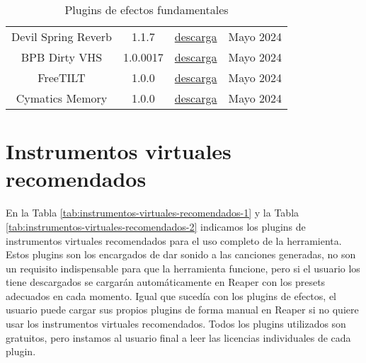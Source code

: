 \begin{table}[h]
\begin{tabular}{c|c|c|c}
            Devil Spring Reverb & 1.1.7 & \href{https://plugins4free.com/plugin/3216/}{descarga} & Mayo 2024\\
            
            BPB Dirty VHS & 1.0.0017 & \href{https://bedroomproducersblog.com/free-vst-plugins/bpb-dirty-vhs/}{descarga} & Mayo 2024\\
            
            FreeTILT & 1.0.0 & \href{https://plugins4free.com/plugin/3743/}{descarga} & Mayo 2024\\
            
            Cymatics Memory & 1.0.0 & \href{https://cymatics.fm/collections/plugins/products/memory-plugin}{descarga} & Mayo 2024\\
            
		\hline
	\end{tabular}
	\caption{Plugins de efectos fundamentales}
	\label{tab:plugins-efectos-fundamentales}
\end{table}


\section{Instrumentos virtuales recomendados}

En la Tabla \ref{tab:instrumentos-virtuales-recomendados-1} y la Tabla \ref{tab:instrumentos-virtuales-recomendados-2} indicamos los plugins de instrumentos virtuales recomendados para el uso completo de la herramienta. Estos plugins son los encargados de dar sonido a las canciones generadas, no son un requisito indispensable para que la herramienta funcione, pero si el usuario los tiene descargados se cargarán automáticamente en Reaper con los presets adecuados en cada momento. Igual que sucedía con los plugins de efectos, el usuario puede cargar sus propios plugins de forma manual en Reaper si no quiere usar los instrumentos virtuales recomendados. Todos los plugins utilizados son gratuitos, pero instamos al usuario final a leer las licencias individuales de cada plugin.

